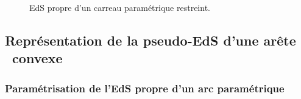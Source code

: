 \begin{figure}
	\centering
	
	\caption{EdS propre d'un carreau paramétrique restreint.}
	\label{fig:EdS_propre_carreau_restreint}
\end{figure}



\subsection{Représentation de la pseudo-EdS d'une arête \brep\ convexe}%

\subsubsection{Paramétrisation de l'EdS propre d'un arc paramétrique}
\label{section:parametrisation_EdS_propre_courbe}

